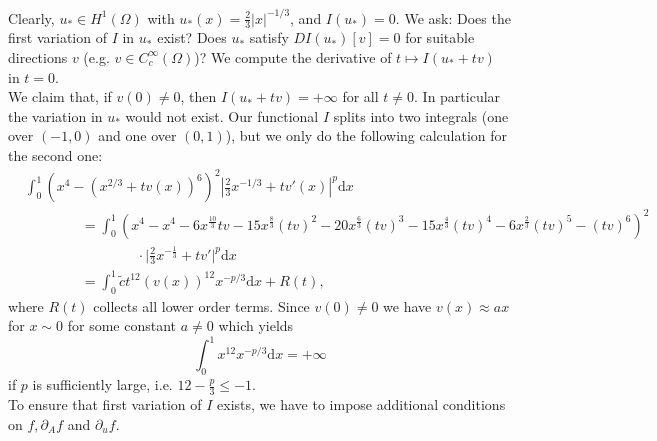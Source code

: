 Clearly, $u_*\in H^1(\Omega)$ with $u_*(x)=\frac{2}{3}\lvert x\rvert^{-1/3}$, and $I(u_*)=0$. We ask: Does the first variation of $I$ in $u_*$ exist? Does $u_*$ satisfy $DI(u_*)[v]=0$ for suitable directions $v$ (e.g. $v\in C_c^\infty(\Omega)$)? We compute the derivative of $t\longmapsto I(u_*+tv)$ in $t=0$.\\

We claim that, if $v(0)\ne0$, then $I(u_*+tv)=+\infty$ for all $t\ne0$. In particular the variation in $u_*$ would not exist. Our functional $I$ splits into two integrals (one over $(-1,0)$ and one over $(0,1)$), but we only do the following calculation for the second one:
\begin{align*}
	&\int_0^1{(x^4-(x^{2/3}+tv(x))^6)^2\left\lvert\frac{2}{3}x^{-1/3}+tv'(x)\right\rvert^p\mathrm{d}x}\\
	&\qquad\qquad=\int_0^1{(x^4-x^4-6x^\frac{10}{3}tv-15x^\frac{8}{3}(tv)^2-20x^\frac{6}{3}(tv)^3-15x^\frac{4}{3}(tv)^4-6x^\frac{2}{3}(tv)^5-(tv)^6)^2}\\
	&\qquad\qquad\qquad\qquad\cdot\lvert\frac{2}{3}x^{-\frac{1}{3}}+tv'\rvert^p\mathrm{d}x\\
	&\qquad\qquad=\int_0^1{\tilde{c}t^{12}(v(x))^{12}x^{-p/3}\mathrm{d}x}+R(t),
\end{align*}
where $R(t)$ collects all lower order terms. Since $v(0)\ne0$ we have $v(x)\approx ax$ for $x\sim0$ for some constant $a\ne0$ which yields
\[\int_0^1{x^{12}x^{-p/3}\mathrm{d}x}=+\infty\]
if $p$ is sufficiently large, i.e. $12-\frac{p}{3}\leq-1$.\\[11pt]

To ensure that first variation of $I$ exists, we have to impose additional conditions on $f,\partial_Af$ and $\partial_uf$.\\

